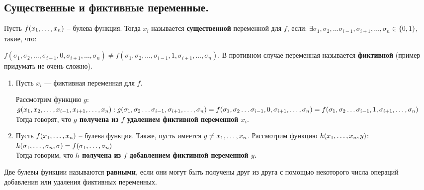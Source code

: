 \subsection{Существенные и фиктивные переменные.} 
\begin{definition}
	Пусть $f(x_1, \ldots, x_n)$ -- булева функция. 
	Тогда $x_i$ называется \textbf{существенной} переменной для $f$, если:  $\exists{\sigma_1,\sigma_2, \ldots \sigma_{i-1}, \sigma_{i+1}, \ldots, \sigma_{n}}\in\{0,1\}$, такие, что: 

$ f(\sigma_1,\sigma_2, \ldots ,\sigma_{i-1}, 0, \sigma_{i+1}, \ldots, \sigma_{n})\neq f(\sigma_1,\sigma_2, \ldots, \sigma_{i-1}, 1, \sigma_{i+1}, \ldots, \sigma_{n}).$
	В противном случае переменная называется \textbf{фиктивной} (пример придумать не очень сложно).
\end{definition}
\begin{enumerate}
	\item 
	Пусть $x_i$ --- фиктивная переменная для $f$. 

    Рассмотрим функцию $g$:
    $g(x_1,x_2,\ldots,x_{i-1},x_{i+1}, \ldots, x_{n}): \\
    g(\sigma_1,\sigma_2 \ldots \sigma_{i-1}, \sigma_{i+1}, \ldots, \sigma_{n})=f(\sigma_1,\sigma_2 \ldots \sigma_{i-1},0, \sigma_{i+1}, \ldots, \sigma_{n}) =f(\sigma_1,\sigma_2 \ldots \sigma_{i-1},1, \sigma_{i+1}, \ldots, \sigma_{n}) $
    Тогда говорят, что  \textbf{$g$ получена из $f$ удалением фиктивной переменной $x_i$}. \\

    \item 
     Пусть $f(x_1, \ldots, x_n)$ -- булева функция. Также, пусть имеется $y \neq x_1, \ldots, x_n $. Рассмотрим функцию $h(x_1, \ldots, x_n,y)$: \\
$h(\sigma_1, \ldots, \sigma_n,\sigma)=f(\sigma_1, \ldots, \sigma_n)$ \\
Тогда говорим, что \textbf{$h$ получена из $f$ добавлением фиктивной переменной  $y$.}

\end{enumerate}
\begin{definition}
	Две булевы функции называются \textbf{равными}, если они могут быть получены друг из друга с помощью некоторого числа операций добавления или удаления фиктивных переменных. \\
\end{definition}
